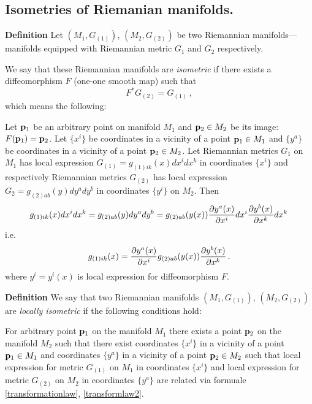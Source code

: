 \documentclass[12pt]{article}
\theoremstyle{theorem}
\numberwithin{equation}{section}
\begin{document}
\subsection {Isometries of Riemanian manifolds.}


{\bf Definition}  Let $(M_1,G_{(1)})$, $(M_2,G_{(2)})$ be two Riemannian manifolds---manifolds equipped
with Riemannian metric $G_1$ and $G_2$ respectively.




We say that these Riemannian manifolds are {\it isometric} if  there exists a diffeomorphism $F$
(one-one smooth map) such  that
              $$
            F^*G_{(2)}=G_{(1)}\,,
              $$
which  means the following:


      Let ${\bf p}_1$ be an arbitrary point on manifold $M_1$ and ${\bf p}_2\in M_2$ be its image:$F({\bf p}_1)={\bf p}_2$.
      Let $\{x^i\}$ be coordinates in a vicinity of a point ${\bf p}_1\in M_1$
      and $\{y^a\}$ be coordinates in a vicinity of a point ${\bf p}_2\in M_2$.
      Let  Riemannian  metrics  $G_1$ on $M_1$ has local expression
      $G_{(1)}=g_{(1)ik}(x)dx^idx^k$ in coordinates $\{x^i\}$   and respectively
      Riemannian  metrics  $G_{(2)}$ has local expression
      $G_2=g_{(2)ab}(y)dy^ady^b$ in coordinates $\{y^i\}$ on $M_2$.
                 Then
                 \begin{equation}\label{transformationlaw}
   g_{(1)ik}(x)dx^idx^k=g_{(2)ab}(y)dy^ady^b=g_{(2)ab}(y(x))
   {\partial y^a(x)\over \partial x^i}dx^i{\partial y^b(x)\over \partial x^k}dx^k\,
                 \end{equation}
    i.e.  \begin{equation}\label{transformationlaw2}
   g_{(1)ik}(x)={\partial y^a(x)\over \partial x^i}g_{(2)ab}(y(x)){\partial y^b(x)\over \partial x^k}\,.
                 \end{equation}
 where $y^i=y^i(x)$ is local expression for diffeomorphism  $F$.

\m

  {\bf Definition}  We say that two Riemannian manifolds $(M_1,G_{(1)})$, $(M_2,G_{(2)})$
  are {\it locally isometric} if  the following conditions hold:

  For  arbitrary point ${\bf p}_1$ on the manifold $M_1$ there exists a point ${\bf p}_2$ on the manifold
  $M_2$ such that there exist coordinates $\{x^i\}$ in a vicinity of a point ${\bf p}_1\in M_1$
      and coordinates $\{y^a\}$ in a vicinity of a point ${\bf p}_2\in M_2$
      such that local expression  for metric $G_{(1)}$ on $M_1$ in coordinates
      $\{x^i\}$ and  local expression  for metric $G_{(2)}$ on $M_2$ in coordinates
      $\{y^a\}$ are related via formuale \eqref{transformationlaw}, \eqref{transformlaw2}.
\end{document}

